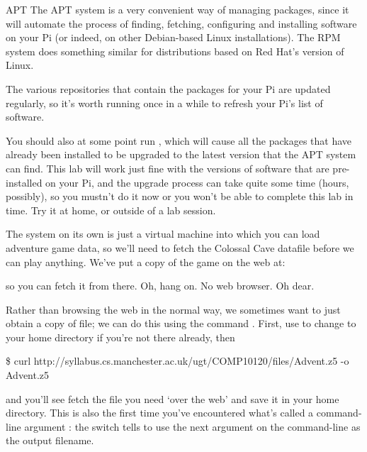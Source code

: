 \begin{rpi}{APT}
The APT system is a very convenient way of managing packages, since it will automate the process of finding, fetching, configuring and installing software on your Pi (or indeed, on other Debian-based Linux installations). The RPM system does something similar for distributions based on Red Hat's version of Linux.

The various repositories that contain the packages for your Pi are updated regularly, so it's worth running  once in a while to refresh your Pi's list of software.

You should also at some point run , which will cause all the packages that have already been installed to be upgraded to the latest version that the APT system can find. This lab will work just fine with the versions of software that are pre-installed on your Pi, and the upgrade process can take quite some time (hours, possibly), so you mustn't do it now or you won't be able to complete this lab in time. Try it at home, or outside of a lab session.
\end{rpi}

The  system on its own is just a virtual machine into which you can load adventure game data, so we'll need to fetch the Colossal Cave datafile before we can play anything. We've put a copy of the game on the web at:

\noindent {}

\noindent so you can fetch it from there. Oh, hang on. No web browser. Oh dear.

Rather than browsing the web in the normal way, we sometimes want to just obtain a copy of file; we can do this using the command  . First, use  to change to your home directory if you're not there already, then

\begin{ttoutenv}
\footnotesize
\$ curl http://syllabus.cs.manchester.ac.uk/ugt/COMP10120/files/Advent.z5 -o Advent.z5
\end{ttoutenv}

\noindent and you'll see  fetch the file you need `over the web' and save it in your home directory. This is also the first time you've encountered what's called a command-line argument : the  switch tells  to use the next argument on the command-line as the output filename.

